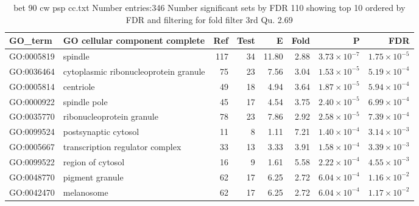 \begin{table}[ht]
\centering
\begin{tabular}{llrrrrrr}
  \hline
GO\_term & GO cellular component complete & Ref & Test & E & Fold & P & FDR \\ 
  \hline
GO:0005819 & spindle  & 117 & 34 & 11.80 & 2.88 & $3.73 \times 10^{-7}$ & $1.75 \times 10^{-5}$ \\ 
  GO:0036464 & cytoplasmic ribonucleoprotein granule  & 75 & 23 & 7.56 & 3.04 & $1.53 \times 10^{-5}$ & $5.19 \times 10^{-4}$ \\ 
  GO:0005814 & centriole  & 49 & 18 & 4.94 & 3.64 & $1.87 \times 10^{-5}$ & $5.94 \times 10^{-4}$ \\ 
  GO:0000922 & spindle pole  & 45 & 17 & 4.54 & 3.75 & $2.40 \times 10^{-5}$ & $6.99 \times 10^{-4}$ \\ 
  GO:0035770 & ribonucleoprotein granule  & 78 & 23 & 7.86 & 2.92 & $2.58 \times 10^{-5}$ & $7.39 \times 10^{-4}$ \\ 
  GO:0099524 & postsynaptic cytosol  & 11 & 8 & 1.11 & 7.21 & $1.40 \times 10^{-4}$ & $3.14 \times 10^{-3}$ \\ 
  GO:0005667 & transcription regulator complex  & 33 & 13 & 3.33 & 3.91 & $1.58 \times 10^{-4}$ & $3.39 \times 10^{-3}$ \\ 
  GO:0099522 & region of cytosol  & 16 & 9 & 1.61 & 5.58 & $2.22 \times 10^{-4}$ & $4.55 \times 10^{-3}$ \\ 
  GO:0048770 & pigment granule  & 62 & 17 & 6.25 & 2.72 & $6.04 \times 10^{-4}$ & $1.16 \times 10^{-2}$ \\ 
  GO:0042470 & melanosome  & 62 & 17 & 6.25 & 2.72 & $6.04 \times 10^{-4}$ & $1.17 \times 10^{-2}$ \\ 
  \hline
\end{tabular}
\caption{bet 90 cw psp cc.txt Number entries:346 Number significant sets by FDR 110 showing top 10 ordered by FDR and filtering for fold filter 3rd Qu. 2.69} 
\label{tab:bet 90 cw psp cc.txt Number entries:346 Number significant sets by FDR 110 showing top 10 ordered by FDR and filtering for fold filter 3rd Qu. 2.69}
\end{table}

